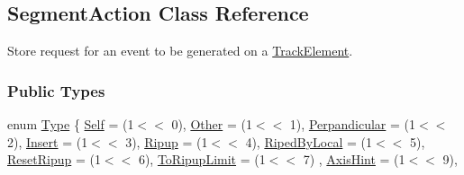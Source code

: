 \hypertarget{classKite_1_1SegmentAction}{}\subsection{Segment\+Action Class Reference}
\label{classKite_1_1SegmentAction}


Store request for an event to be generated on a \mbox{\hyperlink{classKite_1_1TrackElement}{Track\+Element}}.  


\subsubsection*{Public Types}
\begin{DoxyCompactItemize}
\item 
enum \mbox{\hyperlink{classKite_1_1SegmentAction_a1d1cfd8ffb84e947f82999c682b666a7}{Type}} \{ \newline
\mbox{\hyperlink{classKite_1_1SegmentAction_a1d1cfd8ffb84e947f82999c682b666a7aacd3ef9d889b306ca7e7bdcd37ba659a}{Self}} = (1$<$$<$ 0), 
\newline
\mbox{\hyperlink{classKite_1_1SegmentAction_a1d1cfd8ffb84e947f82999c682b666a7a75f0c3176be2226dfe8ad164a0a034a2}{Other}} = (1$<$$<$ 1), 
\newline
\mbox{\hyperlink{classKite_1_1SegmentAction_a1d1cfd8ffb84e947f82999c682b666a7a02330ea306385a34162a1e620a1c37df}{Perpandicular}} = (1$<$$<$ 2), 
\newline
\mbox{\hyperlink{classKite_1_1SegmentAction_a1d1cfd8ffb84e947f82999c682b666a7a8c1f14f07c9eedcbbb2cc61988030646}{Insert}} = (1$<$$<$ 3), 
\newline
\mbox{\hyperlink{classKite_1_1SegmentAction_a1d1cfd8ffb84e947f82999c682b666a7a08900dc237aef7e4a7f50d2ba1ffd748}{Ripup}} = (1$<$$<$ 4), 
\newline
\mbox{\hyperlink{classKite_1_1SegmentAction_a1d1cfd8ffb84e947f82999c682b666a7a4fab9c042ba690bdb62d3c34eab8472d}{Riped\+By\+Local}} = (1$<$$<$ 5), 
\newline
\mbox{\hyperlink{classKite_1_1SegmentAction_a1d1cfd8ffb84e947f82999c682b666a7a9e16316a13899c2e02dd49cf2fb6e91f}{Reset\+Ripup}} = (1$<$$<$ 6), 
\newline
\mbox{\hyperlink{classKite_1_1SegmentAction_a1d1cfd8ffb84e947f82999c682b666a7a6c00c46010d69247a3edc18b70d700fa}{To\+Ripup\+Limit}} = (1$<$$<$ 7)
, \newline
\mbox{\hyperlink{classKite_1_1SegmentAction_a1d1cfd8ffb84e947f82999c682b666a7a46c4ca7a69b5eae786be28f75523b78b}{Axis\+Hint}} = (1$<$$<$ 9), 
$$
\end{DoxyCompactItemize}
